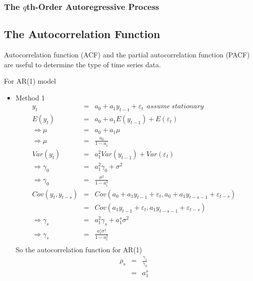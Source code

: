 \subsubsection{The $q$th-Order Autoregressive Process}

\subsection{The Autocorrelation Function}
Autocorrelation function (ACF) and the partial autocorrelation function (PACF) are useful to determine the type of time series data.

For AR(1) model
\begin{itemize}
\item Method 1
\begin{eqnarray*}
y_{t}&=&a_{0}+a_{1}y_{t-1}+\varepsilon_{t}\ \ assume \ stationary\\
E(y_{t})&=&a_{0}+a_{1}E(y_{t-1})+E(\varepsilon_{t})\\
\Rightarrow\mu&=&a_{0}+a_{1}\mu\\
\Rightarrow\mu&=&\frac{a_{0}}{1-a_{1}}\\
Var(y_{t})&=&a_{1}^{2}Var(y_{t-1})+Var(\varepsilon_{t})\\
\Rightarrow \gamma_{0}&=&a_{1}^{2}\gamma_{0}+\sigma^{2}\\
\Rightarrow \gamma_{0}&=&\frac{\sigma^{2}}{1-a_{1}^{2}}\\
Cov(y_{t}, y_{t-s})&=&Cov(a_{0}+a_{1}y_{t-1}+\varepsilon_{t}, a_{0}+a_{1}y_{t-s-1}+\varepsilon_{t-s})\\
			    &=&Cov(a_{1}y_{t-1}+\varepsilon_{t}, a_{1}y_{t-s-1}+\varepsilon_{t-s})\\
\Rightarrow \gamma_{s}&=&a_{1}^{2}\gamma_{s}+a_{1}^{s}\sigma^{2}\\
\Rightarrow \gamma_{s}&=&\frac{a_{1}^{s}\sigma^{2}}{1-a_{1}^{2}}\\
\end{eqnarray*}
So the autocorrelation function for AR(1)
\begin{eqnarray*}
\rho_{s}&=&\frac{\gamma_{s}}{\gamma_{0}}\\
&=&a_{1}^{s}
\end{eqnarray*}


\end{itemize}
